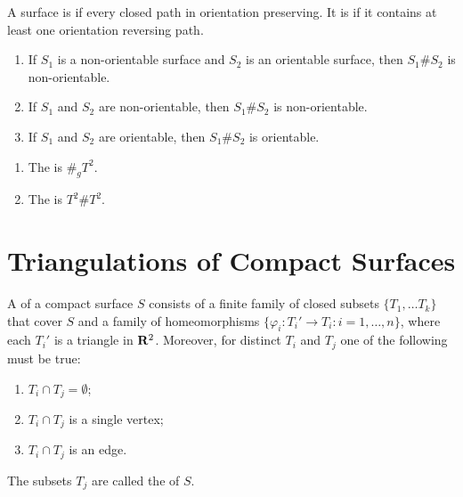 \begin{definition}
	A surface is  if every closed path in orientation preserving. It is   if it contains at least one orientation reversing path.
\end{definition}

\begin{proposition}
	\mbox{}
	\begin{enumerate}[label = (\alph*),itemsep=1pt,topsep=3pt]
		\item If $S_1$ is a non-orientable surface and $S_2$ is an orientable surface, then $S_1 \# S_2$ is non-orientable.
		\item If $S_1$ and $S_2$ are non-orientable, then $S_1 \# S_2$ is non-orientable.
		\item If $S_1$ and $S_2$ are orientable, then $S_1 \# S_2$ is orientable.
	\end{enumerate}
\end{proposition}

\begin{definition}
	\mbox{}
	\begin{enumerate}[label = (\alph*),itemsep=1pt,topsep=3pt]
		\item The  is $\#_g T^2$.
		\item The  is $T^2 \# T^2$.
	\end{enumerate}
\end{definition}

\section{Triangulations of Compact Surfaces}

\begin{definition}
	A  of a compact surface $S$ consists of a finite family of closed subsets $\{T_1,\ldots T_k\}$ that cover $S$ and a family of homeomorphisms $\{\varphi_i:T_i' \rightarrow T_i : i = 1,\ldots ,n\}$, where each $T_i'$ is a triangle in $\mathbf{R}^2$. Moreover, for distinct $T_i$ and $T_j$ one of the following must be true:
	\mbox{}
	\begin{enumerate}[label = (\roman*),itemsep=1pt,topsep=3pt]
		\item $T_i \cap T_j = \emptyset$;
		\item $T_i \cap T_j$ is a single vertex;
		\item $T_i \cap T_j$ is an edge.
	\end{enumerate}
	The subsets $T_j$ are called the  of $S$.
\end{definition}

